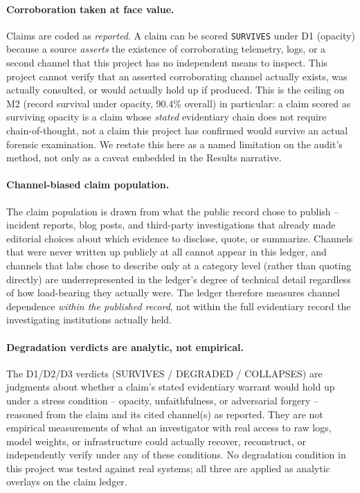 \paragraph{Corroboration taken at face value.} Claims are coded as
\emph{reported}. A claim can be scored \texttt{SURVIVES} under D1 (opacity)
because a source \emph{asserts} the existence of corroborating telemetry,
logs, or a second channel that this project has no independent means to
inspect. This project cannot verify that an asserted corroborating channel
actually exists, was actually consulted, or would actually hold up if
produced. This is the ceiling on M2 (record survival under opacity, 90.4\%
overall) in particular: a claim scored as surviving opacity is a claim whose
\emph{stated} evidentiary chain does not require chain-of-thought, not a
claim this project has confirmed would survive an actual forensic
examination. We restate this here as a named limitation on the audit's
method, not only as a caveat embedded in the Results narrative.

\paragraph{Channel-biased claim population.} The claim population is drawn
from what the public record chose to publish -- incident reports, blog posts,
and third-party investigations that already made editorial choices about
which evidence to disclose, quote, or summarize. Channels that were never
written up publicly at all cannot appear in this ledger, and channels that
labs chose to describe only at a category level (rather than quoting
directly) are underrepresented in the ledger's degree of technical detail
regardless of how load-bearing they actually were. The ledger therefore
measures channel dependence \emph{within the published record}, not within
the full evidentiary record the investigating institutions actually held.

\paragraph{Degradation verdicts are analytic, not empirical.} The D1/D2/D3
verdicts (SURVIVES / DEGRADED / COLLAPSES) are judgments about whether a
claim's stated evidentiary warrant would hold up under a stress condition --
opacity, unfaithfulness, or adversarial forgery -- reasoned from the claim
and its cited channel(s) as reported. They are not empirical measurements of
what an investigator with real access to raw logs, model weights, or
infrastructure could actually recover, reconstruct, or independently verify
under any of these conditions. No degradation condition in this project was
tested against real systems; all three are applied as analytic overlays on
the claim ledger.

